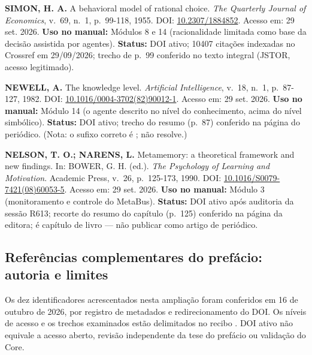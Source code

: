 \begin{referencia}
\textbf{SIMON, H. A.} A behavioral model of rational choice. \emph{The
Quarterly Journal of Economics}, v.~69, n.~1, p.~99-118, 1955. DOI:
\href{https://doi.org/10.2307/1884852}{10.2307/1884852}. Acesso em: 29 set. 2026.
\textbf{Uso no manual:} Módulos 8 e 14 (racionalidade limitada como base da
decisão assistida por agentes). \textbf{Status:} DOI ativo; 10407 citações
indexadas no Crossref em 29/09/2026; trecho de p.~99 conferido no texto
integral (JSTOR, acesso legitimado).
\end{referencia}

\begin{referencia}
\textbf{NEWELL, A.} The knowledge level. \emph{Artificial Intelligence},
v.~18, n.~1, p.~87-127, 1982. DOI:
\href{https://doi.org/10.1016/0004-3702(82)90012-1}{10.1016/0004-3702(82)90012-1}. Acesso em: 29 set. 2026.
\textbf{Uso no manual:} Módulo 14 (o agente descrito no nível do conhecimento,
acima do nível simbólico). \textbf{Status:} DOI ativo; trecho do resumo
(p.~87) conferido na página do periódico. (Nota: o sufixo correto é
;  não resolve.)
\end{referencia}

\begin{referencia}
\textbf{NELSON, T. O.; NARENS, L.} Metamemory: a theoretical framework and new
findings. In: BOWER, G. H. (ed.). \emph{The Psychology of Learning and
Motivation}. Academic Press, v.~26, p.~125-173, 1990. DOI:
\href{https://doi.org/10.1016/S0079-7421(08)60053-5}{10.1016/S0079-7421(08)60053-5}. Acesso em: 29 set. 2026.
\textbf{Uso no manual:} Módulo 3 (monitoramento e controle do MetaBus).
\textbf{Status:} DOI ativo após auditoria da sessão R613; recorte do resumo do
capítulo (p.~125) conferido na página da editora; é capítulo de livro — não
publicar como artigo de periódico.
\end{referencia}

\subsection*{Referências complementares do prefácio: autoria e limites}
Os dez identificadores acrescentados nesta ampliação foram conferidos em
16 de outubro de 2026, por registro de metadados e redirecionamento do DOI.
Os níveis de acesso e os trechos examinados estão delimitados no recibo
. DOI ativo não equivale a acesso aberto,
revisão independente da tese do prefácio ou validação do Core.

